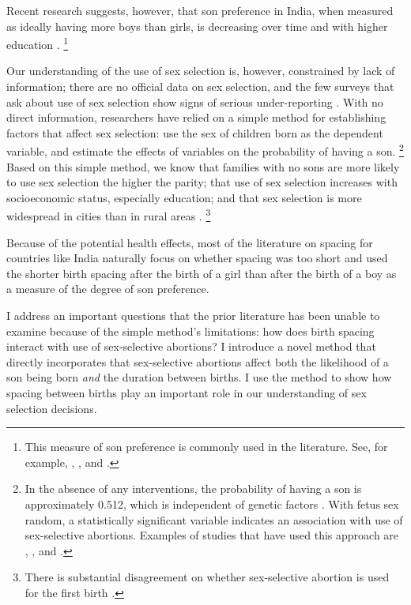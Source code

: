 \documentclass[12pt,letterpaper]{article}
\begin{document}
Recent research suggests, however, that son preference in India, when measured 
as ideally having more boys than girls, is decreasing over time and with 
higher education \citep{bhat03,pande07}.%
\footnote{
This measure of son preference is commonly used in the literature. 
See, for example, \citet{clark00}, \citet{Jensen2009}, and \cite{Hu2015}.
}


Our understanding of the use of sex selection is, however, constrained by 
lack of information;
there are no official data on sex selection, and the few surveys that ask 
about use of sex selection show signs of serious under-reporting \citep{goodkind96}.
With no direct information, researchers have relied on a simple method for 
establishing factors that affect sex selection: use the sex of children born as 
the dependent variable, and estimate the effects of variables on the probability 
of having a son.%
\footnote{
In the absence of any interventions, the probability of having a son
is approximately 0.512, which is independent of genetic factors \citep{ben-porath76b,jacobsen99}.
With fetus sex random, a statistically significant variable indicates an association with 
use of sex-selective abortions.
Examples of studies that have used this approach are \cite{retherford03b},
\cite{jha06}, and \cite{abrevaya09}. 
}
Based on this simple method, we know that families with no sons are more likely to
use sex selection the higher the parity;
that use of sex selection increases with socioeconomic status, especially education;
and that sex selection is more widespread in cities than in rural areas 
\citep{retherford03b,jha06,abrevaya09}.%
\footnote{
There is substantial disagreement on whether sex-selective abortion is used for the 
first birth \citep{retherford03b,jha06}.
}





Because of the potential health effects, most of the literature on spacing 
for countries like India naturally focus on whether spacing was too short
and used the shorter birth spacing after the birth of a girl than after the
birth of a boy as a measure of the degree of son preference.





I address an important questions that the prior literature has been unable
to examine because of the simple method's limitations:
how does birth spacing interact with use of sex-selective abortions?
I introduce a novel method that directly incorporates that sex-selective 
abortions affect both the likelihood of a son being born \emph{and} the duration between 
births.
I use the method to show how spacing between births play an important role in our 
understanding of sex selection decisions.
\end{document}
